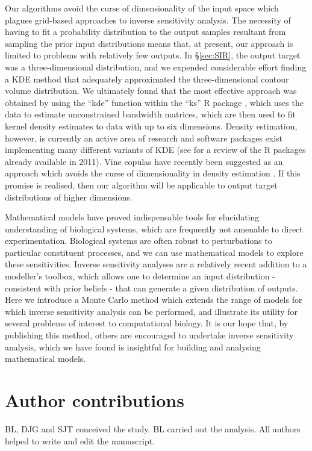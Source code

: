 \documentclass[10pt,letterpaper]{article}
\begin{document}
Our algorithms avoid the curse of dimensionality of the input space which plagues grid-based approaches to inverse sensitivity analysis. The necessity of having to fit a probability distribution to the output samples resultant from sampling the prior input distributions means that, at present, our approach is limited to problems with relatively few outputs. In \S \ref{sec:SIR}, the output target was a three-dimensional distribution, and we expended considerable effort finding a KDE method that adequately approximated the three-dimensional contour volume distribution. We ultimately found that the most effective approach was obtained by using the ``kde'' function within the ``ks'' R package \cite{duong2018package,RLanguage}, which uses the data to estimate unconstrained bandwidth matrices, which are then used to fit kernel density estimates to data with up to six dimensions. Density estimation, however, is currently an active area of research and software packages exist implementing many different variants of KDE (see \cite{deng2011density} for a review of the R packages already available in 2011). Vine copulas have recently been suggested as an approach which avoids the curse of dimensionality in density estimation \cite{nagler2016evading}. If this promise is realised, then our algorithm will be applicable to output target distributions of higher dimensions.

Mathematical models have proved indispensable tools for elucidating understanding of biological systems, which are frequently not amenable to direct experimentation. Biological systems are often robust to perturbations to particular constituent processes, and we can use mathematical models to explore these sensitivities. Inverse sensitivity analyses are a relatively recent addition to a modeller's toolbox, which allows one to determine an input distribution - consistent with prior beliefs - that can generate a given distribution of outputs. Here we introduce a Monte Carlo method which extends the range of models for which inverse sensitivity analysis can be performed, and illustrate its utility for several problems of interest to computational biology. It is our hope that, by publishing this method, others are encouraged to undertake inverse sensitivity analysis, which we have found is insightful for building and analysing mathematical models.

\section{Author contributions}
BL, DJG and SJT conceived the study. BL carried out the analysis. All authors helped to write and edit the manuscript.


\nolinenumbers



\end{document}
